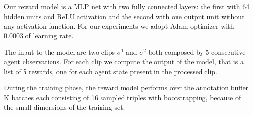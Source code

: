 Our reward model is a MLP net with two fully connected layers: the first with 64 hidden units and ReLU activation and the second with one output unit without any activation function. For our experiments we adopt Adam optimizer with $0.0003$ of learning rate.

The input to the model are two clips $\sigma^1$ and $\sigma^2$ both composed by 5 consecutive agent observations. For each clip we compute the output of the model, that is a list of 5 rewards, one for each agent state present in the processed clip. 

During the training phase, the reward model performs over the annotation buffer K batches each consisting of 16 sampled triples with bootstrapping, because of the small dimensions of the training set. 

